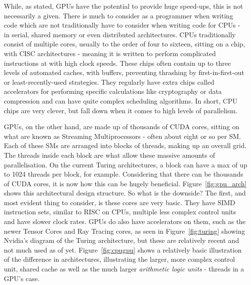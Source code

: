 While, as stated, GPUs have the potential to provide huge speed-ups, this is not necessarily a given. There is much to consider as a programmer when writing code which are not traditionally have to consider when writing code for CPUs - in serial, shared memory or even distributed architectures. CPUs traditionally consist of multiple cores, usually to the order of four to sixteen, sitting on a chip, with CISC architectures - meaning it is written to perform complicated instructions at with high clock speeds. These chips often contain up to three levels of automated caches, with buffers, preventing thrashing by first-in-first-out or least-recently-used strategies. They regularly have extra chips called accelerators for performing specific calculations like cryptography or data compression and can have quite complex scheduling algorithms. In short, CPU chips are very clever, but fall down when it comes to high levels of parallelism.

GPUs, on the other hand, are made up of thousands of CUDA cores, sitting on what are known as Streaming Multiprocessors - often about eight or so per SM. Each of these SMs are arranged into blocks of threads, making up an overall grid. The threads inside each block are what allow these massive amounts of parallelisation. On the current Turing architectures, a block can have a max of up to 1024 threads per block, for example. Considering that there can be thousands of CUDA cores, it is now  how this can be hugely beneficial. Figure~\ref{fig:gpu_arch} shows this architectural design structure. So what is the downside? The first, and most evident thing to consider, is these cores are very basic. They have SIMD instruction sets, similar to RISC on CPUs, multiple less complex control units and have slower clock rates. GPUs do also have accelerators on them, such as the newer Tensor Cores and Ray Tracing cores, as seen in Figure~\ref{fig:turing} showing Nvidia's diagram of the Turing architecture, but these are relatively recent and not much used as of yet. Figure~\ref{fig:cpugpu} shows a relatively basic illustration of the difference in architectures, illustrating the larger, more complex control unit, shared cache as well as the much larger \textit{arithmetic logic units} - threads in a GPU's case.


